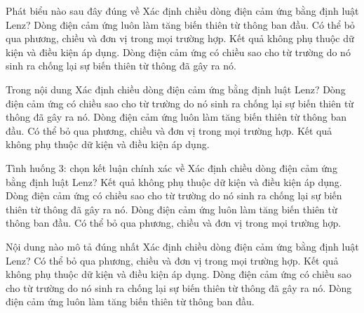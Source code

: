 \begin{ex}
Phát biểu nào sau đây đúng về Xác định chiều dòng điện cảm ứng bằng định luật Lenz?
\choice
{Dòng điện cảm ứng luôn làm tăng biến thiên từ thông ban đầu.}
{Có thể bỏ qua phương, chiều và đơn vị trong mọi trường hợp.}
{Kết quả không phụ thuộc dữ kiện và điều kiện áp dụng.}
{\True Dòng điện cảm ứng có chiều sao cho từ trường do nó sinh ra chống lại sự biến thiên từ thông đã gây ra nó.}
\end{ex}

\begin{ex}
Trong nội dung Xác định chiều dòng điện cảm ứng bằng định luật Lenz?
\choice
{\True Dòng điện cảm ứng có chiều sao cho từ trường do nó sinh ra chống lại sự biến thiên từ thông đã gây ra nó.}
{Dòng điện cảm ứng luôn làm tăng biến thiên từ thông ban đầu.}
{Có thể bỏ qua phương, chiều và đơn vị trong mọi trường hợp.}
{Kết quả không phụ thuộc dữ kiện và điều kiện áp dụng.}
\end{ex}

\begin{ex}
Tình huống 3: chọn kết luận chính xác về Xác định chiều dòng điện cảm ứng bằng định luật Lenz?
\choice
{Kết quả không phụ thuộc dữ kiện và điều kiện áp dụng.}
{\True Dòng điện cảm ứng có chiều sao cho từ trường do nó sinh ra chống lại sự biến thiên từ thông đã gây ra nó.}
{Dòng điện cảm ứng luôn làm tăng biến thiên từ thông ban đầu.}
{Có thể bỏ qua phương, chiều và đơn vị trong mọi trường hợp.}
\end{ex}

\begin{ex}
Nội dung nào mô tả đúng nhất Xác định chiều dòng điện cảm ứng bằng định luật Lenz?
\choice
{Có thể bỏ qua phương, chiều và đơn vị trong mọi trường hợp.}
{Kết quả không phụ thuộc dữ kiện và điều kiện áp dụng.}
{\True Dòng điện cảm ứng có chiều sao cho từ trường do nó sinh ra chống lại sự biến thiên từ thông đã gây ra nó.}
{Dòng điện cảm ứng luôn làm tăng biến thiên từ thông ban đầu.}
\end{ex}


